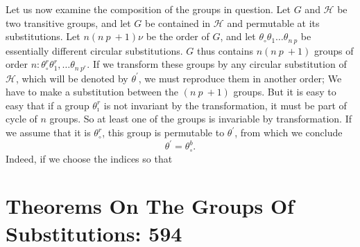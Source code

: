 \documentclass[11pt,fancy]{elegantbook}
\begin{document}
Let us now examine the composition of the groups in question. Let $G$ and $\mathcal{H}$ be two transitive groups, and let $G$ be contained in $\mathcal{H}$ and permutable at its substitutions. Let $n (n \ p \ + 1)\nu$ be the order of $G$, and let $\theta_\circ\theta_1 \dots \theta_{n \ p}$ be essentially different circular substitutions. $G$ thus contains $n (n \ p \ + 1)$ groups of order $n: \theta_\circ^{r}\theta_1^{r}, \dots \theta_{n \ p^{r}}$. If we transform these groups by any circular substitution of $\mathcal{H}$, which will be denoted by $\theta^{'}$, we must reproduce them in another order; We have to make a substitution between the $(n \ p \ + 1)$ groups. But it is easy to easy that if a group $\theta_\imath^{r}$ is not invariant by the transformation, it must be part of cycle of $n$ groups. So at least one of the groups is invariable by transformation. If we assume that it is $\theta_\circ^{r}$, this group is permutable to $\theta^{'}$, from which we conclude 
\begin{equation}
    \theta^{'}=\theta_\circ^{b}.
\end{equation}
Indeed, if we choose the indices so that 


\section{Theorems On The Groups Of Substitutions: 594}
\end{document}
